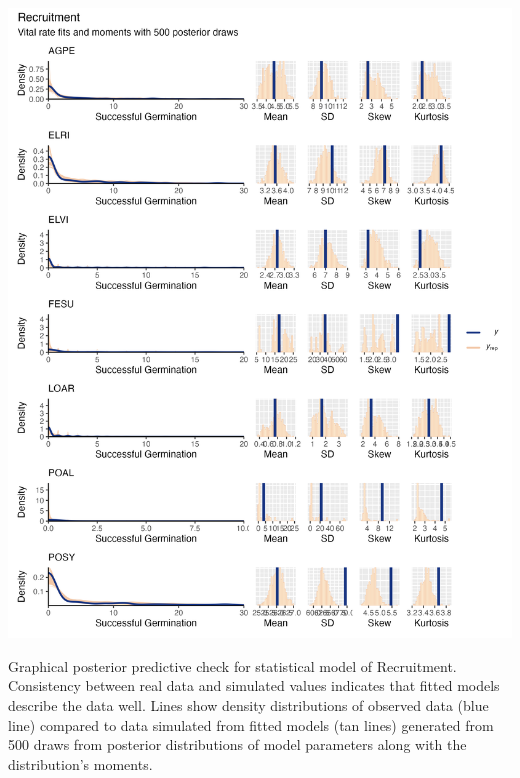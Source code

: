 \documentclass[lineno, sn-basic]{sn-jnl}%
\providecommand{\DIFadd}[1]{{\protect\color{blue}#1}} %
\providecommand{\DIFadd}[1]{{\protect\color{blue}\uwave{#1}}} %
\providecommand{\DIFaddFL}[1]{\DIFadd{#1}} %
\begin{document}
\begin{myfigure}[H]
	\centering
	\includegraphics[width = \linewidth]{stosbyspecies_densplot.png}
	\caption[Graphical posterior predictive check for statistical model of Recruitment]{\DIFaddFL{Graphical posterior predictive check for statistical model of Recruitment. Consistency between real data and simulated values indicates that fitted models describe the data well. Lines show density distributions of observed data (blue line) compared to data simulated from fitted models (tan lines) generated from 500 draws from posterior distributions of model parameters along with the distribution's moments.}}
\end{myfigure}
\end{document}
